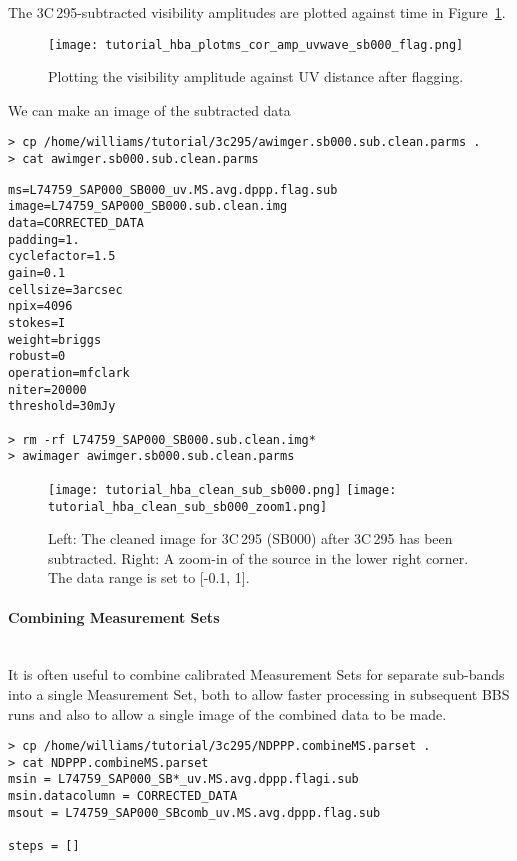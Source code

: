 The 3C\,295-subtracted visibility amplitudes are plotted against time in Figure~\ref{fig:corrected_plotms1_sub}.
\begin{figure}[htp]
 \centering
\texttt{[image: tutorial\_hba\_plotms\_cor\_amp\_uvwave\_sb000\_flag.png]}
\caption{Plotting the visibility amplitude against UV distance after flagging.}
\label{fig:corrected_plotms1_sub}
\end{figure}


We can make an image of the subtracted data
\begin{verbatim}
> cp /home/williams/tutorial/3c295/awimger.sb000.sub.clean.parms .
> cat awimger.sb000.sub.clean.parms
\end{verbatim}
\begin{lstlisting}
ms=L74759_SAP000_SB000_uv.MS.avg.dppp.flag.sub
image=L74759_SAP000_SB000.sub.clean.img
data=CORRECTED_DATA
padding=1.
cyclefactor=1.5
gain=0.1
cellsize=3arcsec
npix=4096
stokes=I
weight=briggs
robust=0
operation=mfclark
niter=20000
threshold=30mJy

> rm -rf L74759_SAP000_SB000.sub.clean.img*
> awimager awimger.sb000.sub.clean.parms
\end{lstlisting}


\begin{figure}[htp]
 \centering
\texttt{[image: tutorial\_hba\_clean\_sub\_sb000.png]}
\texttt{[image: tutorial\_hba\_clean\_sub\_sb000\_zoom1.png]}
\caption{Left: The cleaned image for 3C\,295 (SB000) after 3C\,295 has been subtracted. Right: A zoom-in of the source in the lower right corner. The data range is set to [-0.1, 1].}
\label{fig:tutorial_hba_images_clean_sub}
\end{figure}


\paragraph{Combining Measurement Sets}\mbox{}\\

It is often useful to combine calibrated Measurement Sets for separate sub-bands into a single Measurement
Set, both to allow faster processing in subsequent BBS runs and also to allow a single image of the combined
data to be made.

\begin{verbatim}
> cp /home/williams/tutorial/3c295/NDPPP.combineMS.parset .
> cat NDPPP.combineMS.parset
msin = L74759_SAP000_SB*_uv.MS.avg.dppp.flagi.sub
msin.datacolumn = CORRECTED_DATA
msout = L74759_SAP000_SBcomb_uv.MS.avg.dppp.flag.sub

steps = []
\end{verbatim}


